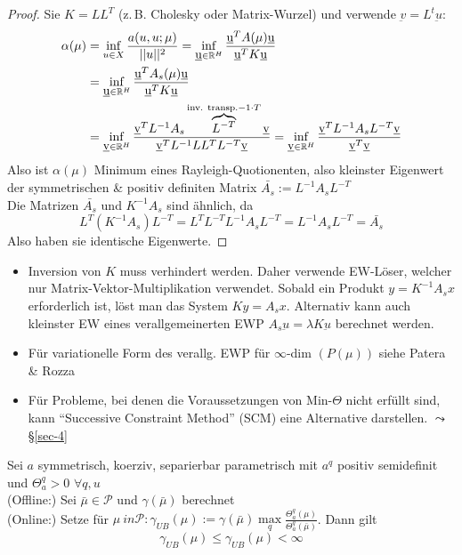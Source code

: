 \begin{proof}
	Sie $K = L L^T$ (z.\,B. Cholesky oder Matrix-Wurzel) und verwende $\underbar v = L^t \underbar u$:
	\begin{align*}
		\alpha (\mu) &= \inf\limits_{u \in X} \frac{a(u,u;\mu)}{||u||^2} = \inf\limits_{\underbar u \in \mathbb{R}^H} \frac{\underbar u^T A(\mu) \underbar u}{\underbar u^T K \underbar u} \\
		&= \inf\limits_{\underbar u \in \mathbb{R}^H} \frac{\underbar u^T A_s(\mu) \underbar u}{\underbar u^T K \underbar u} \\
		&= \inf\limits_{\underbar v \in \mathbb{R}^H} \frac{\underbar v^T L^{-1} A_s \overbrace{L^{-T}}^{\text{inv. transp.} -1 \cdot T} \underbar v}{\underbar v^T L^{-1} L L^T L^{-T} \underbar v} = \inf\limits_{\underbar v \in \mathbb{R}^H} \frac{\underbar v^T L^{-1} A_s L^{-T} \underbar v}{\underbar v^T \underbar v}
	\end{align*}
	Also ist $\alpha(\mu)$ Minimum eines Rayleigh-Quotionenten, also kleinster Eigenwert der symmetrischen \& positiv definiten Matrix $\bar{A_s} := L^{-1} A_s L^{-T}$ \\
	Die Matrizen $\bar{A_s}$ und $K^{-1} A_s$ sind ähnlich, da 
	\[
		L^T(K^{-1}A_s)L^{-T} = L^T L^{-T}L^{-1}A_sL^{-T} = L^{-1}A_sL^{-T} = \bar{A_s}
	\]
	Also haben sie identische Eigenwerte.
\end{proof}

\begin{bem} \beginwithlistbem
	\begin{itemize}
		\item Inversion von $K$ muss verhindert werden. Daher verwende EW-Löser, welcher nur Matrix-Vektor-Multiplikation verwendet. Sobald ein Produkt $y=K^{-1}A_s x$ erforderlich ist, löst man das System $Ky = A_s x$. Alternativ kann auch kleinster EW eines verallgemeinerten EWP $A_s \underbar u = \lambda K \underbar u$ berechnet werden.
		\item Für variationelle Form des verallg. EWP für $\infty$-dim $(P(\mu))$ siehe Patera \& Rozza
		\item Für Probleme, bei denen die Voraussetzungen von Min-$\Theta$ nicht erfüllt sind, kann ``Successive Constraint Method'' (SCM) eine Alternative darstellen.  $\leadsto$ §\ref{sec-4}
	\end{itemize}
\end{bem}

\begin{satz}
	Sei $a$ symmetrisch, koerziv, separierbar parametrisch mit $a^q$ positiv semidefinit und $\Theta_a^q > 0 \, \, \forall q,u$ \\
	(Offline:) Sei $\bar{\mu} \in \mathcal{P}$ und $\gamma(\bar{\mu})$ berechnet \\
	(Online:) Setze für $\mu \ in \mathcal{P}: \gamma_{UB}(\mu) := \gamma(\bar{\mu}) \max\limits_q \frac{\Theta_a^q(\mu)}{\Theta_a^q(\bar{\mu})}$. Dann gilt 
	\[
		\gamma_{UB}(\mu) \leq \gamma_{UB} (\mu) < \infty
	\]
\end{satz}

